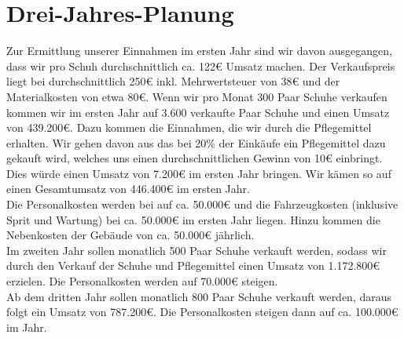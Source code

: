 \chapter{Drei-Jahres-Planung}
\label{cha:9}
Zur Ermittlung unserer Einnahmen im ersten Jahr sind wir davon ausgegangen, dass wir pro Schuh durchschnittlich ca. 122€ Umsatz machen. Der Verkaufspreis liegt bei durchschnittlich 250€ inkl. Mehrwertsteuer von 38€ und der Materialkosten von etwa 80€.
Wenn wir pro Monat 300 Paar Schuhe verkaufen kommen wir im ersten Jahr auf 3.600 verkaufte Paar Schuhe und einen Umsatz von 439.200€. Dazu kommen die Einnahmen, die wir durch die Pflegemittel erhalten. Wir gehen davon aus das bei 20\% der Einkäufe ein Pflegemittel dazu gekauft wird, welches uns einen durchschnittlichen Gewinn von 10€ einbringt. Dies würde einen Umsatz von 7.200€ im ersten Jahr bringen.
Wir kämen so auf einen Gesamtumsatz von 446.400€ im ersten Jahr.\\
Die Personalkosten werden bei auf ca. 50.000€ und die Fahrzeugkosten (inklusive Sprit und Wartung) bei ca. 50.000€ im ersten Jahr liegen. Hinzu kommen die Nebenkosten der Gebäude von ca. 50.000€ jährlich.\\
Im zweiten Jahr sollen monatlich 500 Paar Schuhe verkauft werden, sodass wir durch den Verkauf der Schuhe und Pflegemittel einen Umsatz von 1.172.800€ erzielen.
Die Personalkosten werden auf 70.000€ steigen.\\
Ab dem dritten Jahr sollen monatlich 800 Paar Schuhe verkauft werden, daraus folgt ein Umsatz von 787.200€. Die Personalkosten steigen dann auf ca. 100.000€ im Jahr.\\
